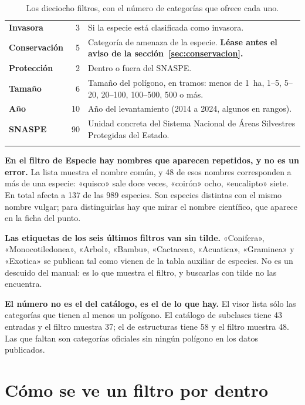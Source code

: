 \documentclass[11pt,a4paper]{report}
\newcommand{\campo}[1]{\textcolor{conaf}{\textbf{#1}}}
\begin{document}
\begin{longtable}{@{}L{3.2cm}r L{8.6cm}@{}}
\campo{Invasora} & 3 & Si la especie está clasificada como invasora.\\
\campo{Conservación} & 5 & Categoría de amenaza de la especie. \textbf{Léase antes el aviso de la sección~\ref{sec:conservacion}.}\\
\campo{Protección} & 2 & Dentro o fuera del SNASPE.\\
\campo{Tamaño} & 6 & Tamaño del polígono, en tramos: menos de 1~ha, 1--5, 5--20, 20--100, 100--500, 500 o más.\\
\campo{Año} & 10 & Año del levantamiento (2014 a 2024, algunos en rangos).\\
\campo{SNASPE} & 90 & Unidad concreta del Sistema Nacional de Áreas Silvestres Protegidas del Estado.\\
\bottomrule
\caption{Los dieciocho filtros, con el número de categorías que ofrece cada uno.}
\end{longtable}

\begin{alerta}
\campo{En el filtro de Especie hay nombres que aparecen repetidos, y no es un
error.} La lista muestra el nombre común, y 48 de esos nombres corresponden a
más de una especie: «quisco» sale doce veces, «coirón» ocho, «eucalipto» siete.
En total afecta a 137 de las 989 especies. Son especies distintas con el mismo
nombre vulgar; para distinguirlas hay que mirar el nombre científico, que
aparece en la ficha del punto.
\end{alerta}

\begin{alerta}
\campo{Las etiquetas de los seis últimos filtros van sin tilde.} «Conifera»,
«Monocotiledonea», «Arbol», «Bambu», «Cactacea», «Acuatica», «Graminea» y
«Exotica» se publican tal como vienen de la tabla auxiliar de especies. No es
un descuido del manual: es lo que muestra el filtro, y buscarlas con tilde no
las encuentra.
\end{alerta}

\begin{nota}
\campo{El número no es el del catálogo, es el de lo que hay.} El visor lista
sólo las categorías que tienen al menos un polígono. El catálogo de subclases
tiene 43 entradas y el filtro muestra 37; el de estructuras tiene 58 y el
filtro muestra 48. Las que faltan son categorías oficiales sin ningún polígono
en los datos publicados.
\end{nota}

\section{Cómo se ve un filtro por dentro}
\end{document}
